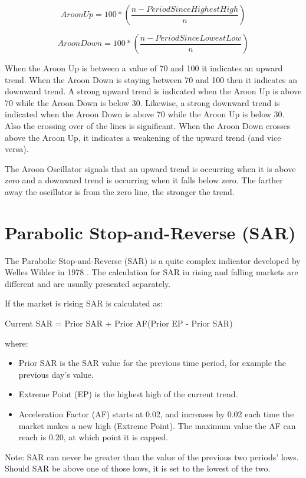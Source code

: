 \[ Aroon Up = 100 * \left( \dfrac{n - PeriodSinceHighestHigh}{n} \right) \]

\[ Aroon Down = 100 * \left( \dfrac{n - PeriodSinceLowestLow}{n} \right) \]

When the Aroon Up is between a value of 70 and 100 it indicates an upward trend. When the Aroon Down is staying between 70 and 100 then it indicates an downward trend. A strong upward trend is indicated when the Aroon Up is above 70 while the Aroon Down is below 30. Likewise, a strong downward trend is indicated when the Aroon Down is above 70 while the Aroon Up is below 30. Also the crossing over of the lines is significant. When the Aroon Down crosses above the Aroon Up, it indicates a weakening of the upward trend (and vice versa).


The Aroon Oscillator signals that an upward trend is occurring when it is above zero and a downward trend is occurring when it falls below zero. The farther away the oscillator is from the zero line, the stronger the trend.

\section{Parabolic Stop-and-Reverse (SAR)}
\label{appB:sar}
The Parabolic Stop-and-Reverse (SAR) is a quite complex indicator developed by Welles Wilder in 1978 \citep{wilder1978new}. The calculation for SAR in rising and falling markets are different and are usually presented separately.

If the market is rising SAR is calculated as:
\begin{center}
Current SAR = Prior SAR + Prior AF(Prior EP - Prior SAR)
\end{center}

where:\\
\begin{itemize}
\item Prior SAR is the SAR value for the previous time period, for example the previous day's value.
\item Extreme Point (EP) is the highest high of the current trend.
\item Acceleration Factor (AF) starts at 0.02, and increases by 0.02 each time the market makes a new high (Extreme Point). The maximum value the AF can reach is 0.20, at which point it is capped.
\end{itemize}
Note:  SAR can never be greater than the value of the previous two periods' lows. Should SAR be above one of those lows, it is set to the lowest of the two.

